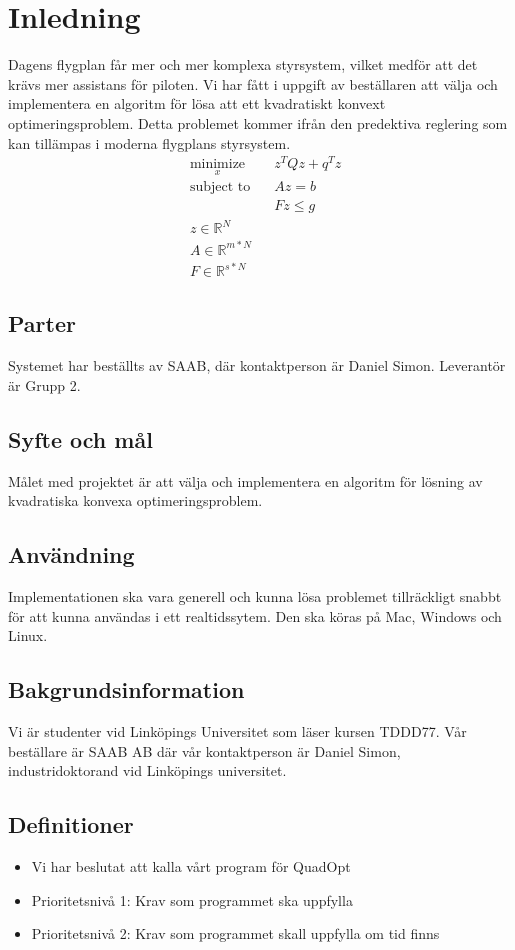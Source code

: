 \section{Inledning}
Dagens flygplan får mer och mer komplexa styrsystem, vilket medför att det krävs mer assistans för piloten. Vi har fått i uppgift av beställaren att välja och implementera en algoritm för lösa att ett kvadratiskt konvext optimeringsproblem. Detta problemet kommer ifrån den predektiva reglering som kan tillämpas i moderna flygplans styrsystem.
\begin{equation*}
\begin{aligned}
& \underset{x}{\text{minimize}}
& & z^{T}Qz+q^{T}z \\
& \text{subject to}
& & Az=b \\
& & & Fz \leq g \\
& z \in \mathbb{R}^N \\
& A \in \mathbb{R}^{m*N}\\
& F \in \mathbb{R}^{s*N}
\end{aligned}
\end{equation*}

\subsection{Parter}
Systemet har beställts av SAAB, där kontaktperson är Daniel Simon. Leverantör är Grupp 2.

\subsection{Syfte och mål}
Målet med projektet är att välja och implementera en algoritm för lösning av kvadratiska konvexa optimeringsproblem.

\subsection{Användning}
Implementationen ska vara generell och kunna lösa problemet tillräckligt snabbt för att kunna användas i ett realtidssytem. Den ska köras på Mac, Windows och Linux.
\subsection{Bakgrundsinformation}
Vi är studenter vid Linköpings Universitet som läser kursen TDDD77. Vår beställare är SAAB AB där vår kontaktperson är Daniel Simon, industridoktorand vid Linköpings universitet. 

\subsection{Definitioner}

\begin{itemize}
\item{Vi har beslutat att kalla vårt program för QuadOpt}
\item{Prioritetsnivå 1: Krav som programmet ska uppfylla}
\item{Prioritetsnivå 2: Krav som programmet skall uppfylla om tid finns}
\end{itemize}
